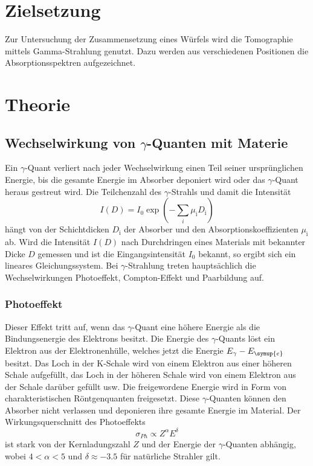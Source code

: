 \section{Zielsetzung}
\label{sec:Zielsetzung}
Zur Untersuchung der Zusammensetzung eines Würfels wird die Tomographie mittels Gamma-Strahlung genutzt.
Dazu werden aus verschiedenen Positionen die Absorptionsspektren aufgezeichnet.

\section{Theorie}
\label{sec:Theorie}

\subsection{Wechselwirkung von \texorpdfstring{$\gamma$}{gamma}-Quanten mit Materie}
\label{sec:WW}
Ein $\gamma$-Quant verliert nach jeder Wechselwirkung einen Teil seiner ursprünglichen Energie, bis die gesamte Energie im Absorber deponiert wird oder das $\gamma$-Quant heraus gestreut wird.
Die Teilchenzahl des $\gamma$-Strahls und damit die Intensität
\begin{equation}
  \label{eq:Absorbtion}
  I(D)=I_0\exp(-\sum_i \mu_\text{i} D_\text{i})
\end{equation}
hängt von der Schichtdicken $D_\text{i}$ der Absorber und den Absorptionskoeffizienten $\mu_\text{i}$ ab. 
Wird die Intensität $I(D)$ nach Durchdringen eines Materials mit bekannter Dicke $D$ gemessen und ist die Eingangsintensität $I_0$ bekannt, so ergibt sich ein lineares 
Gleichungssystem.
Bei $\gamma$-Strahlung treten hauptsächlich die Wechselwirkungen Photoeffekt, Compton-Effekt und Paarbildung auf.

\subsubsection{Photoeffekt}
\label{sec:PhEffekt}
Dieser Effekt tritt auf, wenn das $\gamma$-Quant eine höhere Energie als die Bindungsenergie des Elektrons besitzt.
Die Energie des $\gamma$-Quants löst ein Elektron aus der Elektronenhülle, welches jetzt die Energie $E_\gamma-E_{\symup{e}}$ besitzt.
Das Loch in der K-Schale wird von einem Elektron aus einer höheren Schale aufgefüllt, das Loch in der höheren Schale wird von einem Elektron aus der Schale darüber gefüllt usw.
Die freigewordene Energie wird in Form von charakteristischen Röntgenquanten freigesetzt.
Diese $\gamma$-Quanten können den Absorber nicht verlassen und deponieren ihre gesamte Energie im Material.
Der Wirkungsquerschnitt des Photoeffekts
\begin{equation*}
\sigma_{Ph}\propto Z^\alpha E^\delta
\end{equation*}
ist stark von der Kernladungszahl $Z$ und der Energie der $\gamma$-Quanten abhängig, wobei $\num{4}<\alpha<\num{5}$ und $\delta\approx \num{-3.5}$ für natürliche Strahler gilt.

